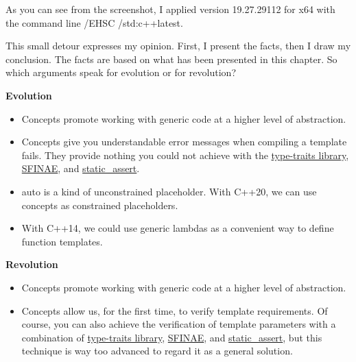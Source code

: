 As you can see from the screenshot, I applied version 19.27.29112 for x64 with the command line /EHSC /std:c++latest.

\begin{tcolorbox}[breakable,enhanced jigsaw,colback=blue!5!white,colframe=blue!75!black,title=Regular Types]

This small detour expresses my opinion. First, I present the facts, then I draw my conclusion. The facts are based on what has been presented in this chapter. So which arguments speak for evolution or for revolution?

\noindent
\textbf{Evolution}

\begin{itemize}
\item 
Concepts promote working with generic code at a higher level of abstraction.

\item 
Concepts give you understandable error messages when compiling a template fails. They provide nothing you could not achieve with the \href{https://en.cppreference.com/w/cpp/header/type_traits}{type-traits library}, \href{https://en.cppreference.com/w/cpp/language/sfinae}{SFINAE}, and \href{https://en.cppreference.com/w/cpp/language/static_assert}{static\_assert}.

\item 
auto is a kind of unconstrained placeholder. With C++20, we can use concepts as constrained placeholders.

\item 
With C++14, we could use generic lambdas as a convenient way to define function templates.
\end{itemize}

\noindent
\textbf{Revolution}

\begin{itemize}
\item 
Concepts promote working with generic code at a higher level of abstraction.

\item 
Concepts allow us, for the first time, to verify template requirements. Of course, you can also achieve the verification of template parameters with a combination of \href{https://en.cppreference.com/w/cpp/header/type_traits}{type-traits library}, \href{https://en.cppreference.com/w/cpp/language/sfinae}{SFINAE}, and \href{https://en.cppreference.com/w/cpp/language/static_assert}{static\_assert}, but this technique is way too advanced to regard it as a general solution.


\end{itemize}
\end{tcolorbox}
